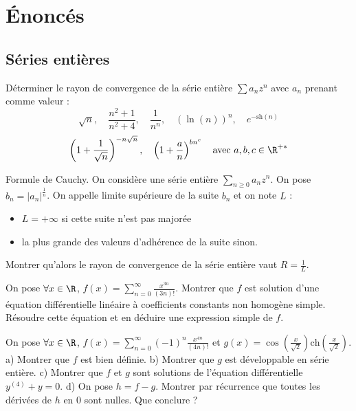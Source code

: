 \section{Énoncés}
\subsection{Séries entières}

\setcounter{numexo}{9}

\begin{exercice}
Déterminer le rayon de convergence de la série entière $\sum a_{n}z^{n}$ avec $a_{n}$ prenant comme valeur : 
$$ \sqrt{n}, \quad \frac{n^{2}+1}{n^{2}+4}, \quad \frac{1}{n^n}, \quad (\ln(n))^{n}, \quad e^{-\mathrm{sh}(n)} $$ 
$$ \left(1+\frac{1}{\sqrt{n}}\right)^{-n\sqrt{n}}, \quad \left(1+\frac{a}{n}\right)^{bn^{c}} \quad \text{avec } a,b,c \in \R^{+*} $$ 
\end{exercice}

\begin{exercice}
Formule de Cauchy. 
On considère une série entière $\sum_{n\ge 0}a_{n}z^{n}$. 
On pose $b_{n}=|a_{n}|^{\frac{1}{n}}$. 
On appelle limite supérieure de la suite $b_{n}$ et on note $L$ : 
\begin{itemize}
 \item $L=+\infty$ si cette suite n'est pas majorée 
 \item la plus grande des valeurs d'adhérence de la suite sinon. 
\end{itemize}
Montrer qu'alors le rayon de convergence de la série entière vaut $R=\frac{1}{L}$. 
\end{exercice}

\begin{exercice}
On pose $\forall x\in\R$, $f(x)=\sum_{n=0}^{\infty}\frac{x^{3n}}{(3n)!}$. 
Montrer que $f$ est solution d'une équation différentielle linéaire à coefficients constants non homogène simple. 
Résoudre cette équation et en déduire une expression simple de $f$. 
\end{exercice}

\begin{exercice}
On pose $\forall x\in\R$, $f(x)=\sum_{n=0}^{\infty}(-1)^{n}\frac{x^{4n}}{(4n)!}$ et $g(x)=\cos\left(\frac{x}{\sqrt{2}}\right)\mathrm{ch}\left(\frac{x}{\sqrt{2}}\right)$. 
a) Montrer que $f$ est bien définie. 
b) Montrer que $g$ est développable en série entière. 
c) Montrer que $f$ et $g$ sont solutions de l'équation différentielle $y^{(4)}+y=0$. 
d) On pose $h=f-g$. Montrer par récurrence que toutes les dérivées de $h$ en 0 sont nulles. Que conclure ? 
\end{exercice}

